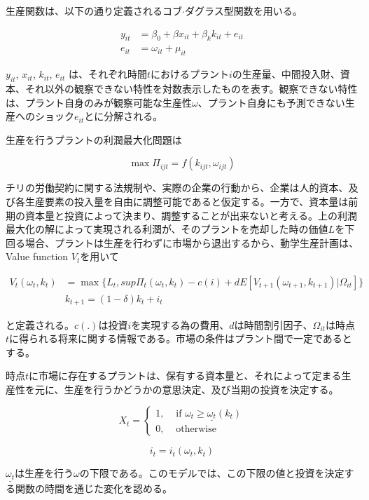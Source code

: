 \documentclass{jsarticle}
\begin{document}
\begin{enumerate}
生産関数は、以下の通り定義されるコブ$\cdot$ダグラス型関数を用いる。

 \begin{align*}
 y_{it} &= \beta_0 + \beta x_{it} + \beta_k k_{it} + e_{it} \\
 e_{it} &= \omega_{it} + \mu_{it}
 \end{align*}

$y_{it}$, $x_{it}$, $k_{it}$, $e_{it}$ は、それぞれ時間$t$におけるプラント$i$の生産量、中間投入財、資本、それ以外の観察できない特性を対数表示したものを表す。観察できない特性は、プラント自身のみが観察可能な生産性$\omega$、プラント自身にも予測できない生産へのショック$e_{it}$とに分解される。

生産を行うプラントの利潤最大化問題は

\[ \max \Pi_{ijt} = f(k_{ijt}, \omega_{ijt}) \]

チリの労働契約に関する法規制や、実際の企業の行動から、企業は人的資本、及び各生産要素の投入量を自由に調整可能であると仮定する。一方で、資本量は前期の資本量と投資によって決まり、調整することが出来ないと考える。上の利潤最大化の解によって実現される利潤が、そのプラントを売却した時の価値$L$を下回る場合、プラントは生産を行わずに市場から退出するから、動学生産計画は、Value function $V_t$を用いて

 \begin{align*}
 V_t (\omega_t, k_t) &= \max \{L_t, sup \Pi_t(\omega_t, k_t) -c(i) + 
 				      d E[V_{t+1} (\omega_{t+1}, k_{t+1})| \Omega_{it}] \} \\
  & k_{t+1} = (1- \delta)k_t + i_t
 \end{align*}

と定義される。$c(.)$は投資$i$を実現する為の費用、$d$は時間割引因子、$\Omega_{it}$は時点$t$に得られる将来に関する情報である。市場の条件はプラント間で一定であるとする。

時点$t$に市場に存在するプラントは、保有する資本量と、それによって定まる生産性を元に、生産を行うかどうかの意思決定、及び当期の投資を決定する。

\[X_{t} = \begin{cases}
1, & \text{ if } \omega_t \geq \underline{\omega_{t}} (k_t) \\
0, & \text{ otherwise}
\end{cases} \]

\[i_t = i_t(\omega_t, k_t) \]

$\underline{\omega_{t}}$は生産を行う$\omega$の下限である。このモデルでは、この下限の値と投資を決定する関数の時間を通じた変化を認める。


\end{enumerate}
\end{document}
